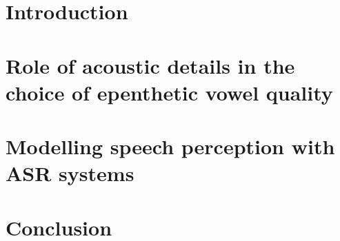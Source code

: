 \documentclass[12pt, twoside]{report}
\begin{document}
\tableofcontents

\chapter{Introduction}
\setcounter{page}{1}


\chapter{Role of acoustic details in the choice of epenthetic vowel quality}
\minitoc

\chapter{Modelling speech perception with ASR systems}
\minitoc

\chapter{Conclusion}





\appendix
\fancyhead{}
\fancyhead[RO,LE]{\nouppercase{\leftmark}}
\fancyfoot{}
\fancyfoot[LE,RO]{\thepage}
\end{document}
